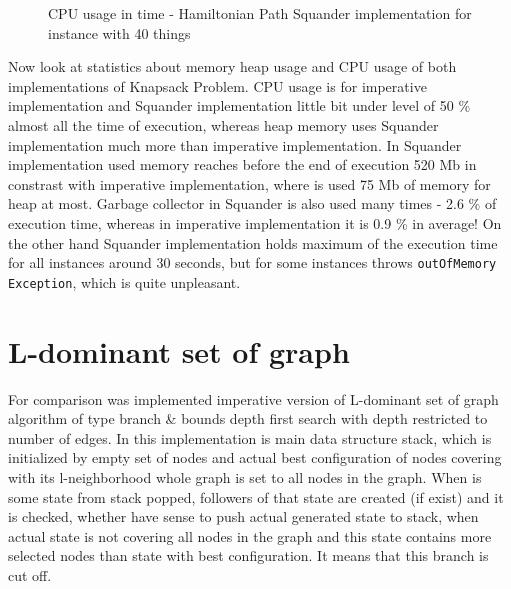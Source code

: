 \documentclass[11pt,twoside,a4paper]{book}
\begin{document}
\begin{figure}[ht]
\begin{center}

\caption{CPU usage in time - Hamiltonian Path Squander implementation for instance with 40 things}
\label{fig:ksSCpu40}
\end{center}
\end{figure}
\clearpage 

Now look at statistics about memory heap usage and CPU usage of both
implementations of Knapsack Problem. CPU usage is for imperative implementation
and Squander implementation little bit under level of 50 \% almost all the time
of execution, whereas heap memory uses Squander implementation much more than imperative
implementation. In Squander implementation used memory reaches before the end of
execution 520 Mb in constrast with imperative implementation, where is used 75
Mb of memory for heap at most. Garbage collector in Squander is also used many
times - 2.6 \% of execution time, whereas in imperative implementation it is
0.9 \% in average! On the other hand Squander implementation holds maximum of
the execution time for all instances around 30 seconds, but for some instances throws
\verb|outOfMemory Exception|, which is quite unpleasant.

\section{L-dominant set of graph}
\label{sec:ldsgComp}
For comparison was implemented imperative version of L-dominant set of graph
algorithm of type branch \& bounds depth first search with depth restricted to
number of edges. In this implementation is main data structure stack, which is
initialized by empty set of nodes and actual best configuration of nodes
covering with its l-neighborhood whole graph is set to all nodes in the graph.
When is some state from stack popped, followers of that state are created (if
exist) and it is checked, whether have sense to push actual generated state to
stack, when actual state is not covering all nodes in the graph and this state
contains more selected nodes than state with best configuration. It means that
this branch is cut off.
\end{document}
